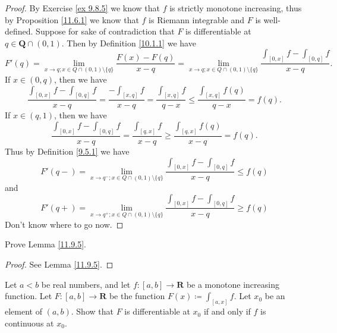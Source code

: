 \begin{proof}
    By Exercise \ref{ex 9.8.5} we know that \(f\) is strictly monotone increasing, thus by Proposition \ref{11.6.1} we know that \(f\) is Riemann integrable and \(F\) is well-defined.
    Suppose for sake of contradiction that \(F\) is differentiable at \(q \in \mathbf{Q} \cap (0, 1)\).
    Then by Definition \ref{10.1.1} we have
    \[
        F'(q) = \lim_{x \to q ; x \in Q \cap (0, 1) \setminus \{q\}} \frac{F(x) - F(q)}{x - q} = \lim_{x \to q ; x \in Q \cap (0, 1) \setminus \{q\}} \frac{\int_{[0, x]} f - \int_{[0, q]} f}{x - q}.
    \]
    If \(x \in (0, q)\), then we have
    \[
        \frac{\int_{[0, x]} f - \int_{[0, q]} f}{x - q} = \frac{-\int_{[x, q]} f}{x - q} = \frac{\int_{[x, q]} f}{q - x} \leq \frac{\int_{[x, q]} f(q)}{q - x} = f(q).
    \]
    If \(x \in (q, 1)\), then we have
    \[
        \frac{\int_{[0, x]} f - \int_{[0, q]} f}{x - q} = \frac{\int_{[q, x]} f}{x - q} \geq \frac{\int_{[q, x]} f(q)}{x - q} = f(q).
    \]
    Thus by Definition \ref{9.5.1} we have
    \[
        F'(q-) = \lim_{x \to q^- ; x \in Q \cap (0, 1) \setminus \{q\}} \frac{\int_{[0, x]} f - \int_{[0, q]} f}{x - q} \leq f(q)
    \]
    and
    \[
        F'(q+) = \lim_{x \to q^+ ; x \in Q \cap (0, 1) \setminus \{q\}} \frac{\int_{[0, x]} f - \int_{[0, q]} f}{x - q} \geq f(q)
    \]
    Don't know where to go now.
\end{proof}

\begin{exercise}\label{ex 11.9.2}
    Prove Lemma \ref{11.9.5}.
\end{exercise}

\begin{proof}
    See Lemma \ref{11.9.5}.
\end{proof}

\begin{exercise}\label{ex 11.9.3}
    Let \(a < b\) be real numbers, and let \(f : [a, b] \to \mathbf{R}\) be a monotone increasing function.
    Let \(F : [a, b] \to \mathbf{R}\) be the function \(F(x) \coloneqq \int_{[a, x]} f\).
    Let \(x_0\) be an element of \((a, b)\).
    Show that \(F\) is differentiable at \(x_0\) if and only if \(f\) is continuous at \(x_0\).
\end{exercise}

